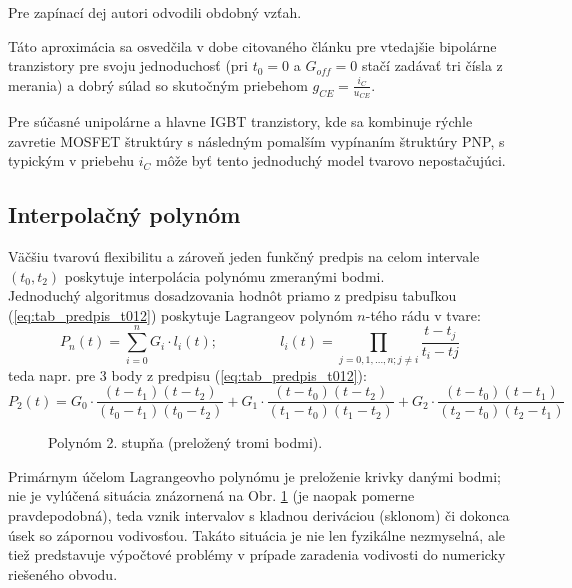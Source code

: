 Pre zapínací dej autori odvodili obdobný vzťah.

Táto aproximácia sa osvedčila v dobe citovaného článku pre vtedajšie bipolárne tranzistory pre svoju jednoduchosť (pri $t_0 = 0$ a $G_{off} = 0$ stačí zadávať tri čísla z merania) a dobrý súlad so skutočným priebehom $g_{CE} = \frac{i_{C}}{u_{CE}}$. 

Pre súčasné unipolárne a hlavne IGBT tranzistory, kde sa kombinuje rýchle zavretie MOSFET štruktúry s následným pomalším vypínaním štruktúry PNP, s typickým  v priebehu $i_C$ môže byť tento jednoduchý model tvarovo nepostačujúci.


\subsection{Interpolačný polynóm}
Väčšiu tvarovú flexibilitu a zároveň jeden funkčný predpis na celom intervale $(t_0, t_2)$ poskytuje interpolácia polynómu zmeranými bodmi.\\
Jednoduchý algoritmus dosadzovania hodnôt priamo z predpisu tabuľkou (\ref{eq:tab_predpis_t012}) poskytuje Lagrangeov polynóm $n$-tého rádu v tvare:
\begin{equation}
	P_n(t) = \sum_{i=0}^n G_i \cdot l_i(t); 
	\;\;\;\;\;\;\;\;\;\;\;\;\;\;\;\;
	l_i(t) = \prod_{j=0,1,\ldots,n; j\neq i} \frac{t - t_j}{t_i - tj}
	\label{eq:Lagrange_vseobec}
\end{equation}
teda napr. pre 3 body z predpisu (\ref{eq:tab_predpis_t012}):
\begin{equation}
	P_2(t) = G_0 \cdot \frac{(t-t_1)(t-t_2)}{(t_0-t_1)(t_0-t_2)} + G_1 \cdot \frac{(t-t_0)(t-t_2)}{(t_1-t_0)(t_1-t_2)} + G_2 \cdot \frac{(t-t_0)(t-t_1)}{(t_2-t_0)(t_2-t_1)}
	\label{Lagrange_z_tabulky}
\end{equation}

\begin{figure}[ht!]
	\centering
	
	\caption{Polynóm 2. stupňa (preložený tromi bodmi).}
	\label{fig:Lagrange_vseobec}
\end{figure}

Primárnym účelom Lagrangeovho polynómu je preloženie krivky danými bodmi; nie je vylúčená situácia znázornená na Obr. \ref{fig:Lagrange_vseobec} (je naopak pomerne pravdepodobná), teda vznik intervalov s kladnou deriváciou (sklonom) či dokonca úsek so zápornou vodivosťou. Takáto situácia je nie len fyzikálne nezmyselná, ale tiež predstavuje výpočtové problémy v prípade zaradenia vodivosti do numericky riešeného obvodu.

